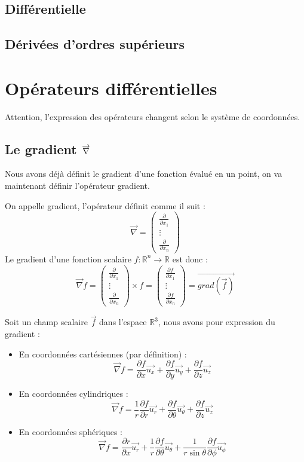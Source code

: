 \section{Différentielle}
\section{Dérivées d'ordres supérieurs}
\chapter{Opérateurs différentielles}
Attention, l'expression des opérateurs changent selon le système de coordonnées.
\section{Le gradient $\protect\overrightarrow{\nabla}$}
Nous avons déjà définit le gradient d'une fonction évalué en un point, on va maintenant définir l'opérateur gradient.
\begin{defi}
On appelle gradient, l'opérateur définit comme il suit :
$$\overrightarrow{\nabla}=\begin{pmatrix}\frac{\partial}{\partial x_1}\\\vdots\\\frac{\partial}{\partial x_n}\end{pmatrix}$$
\newline
Le gradient d'une fonction scalaire $f:\mathbb{R}^n\to\mathbb{R}$ est donc :
$$\overrightarrow{\nabla}f=\begin{pmatrix}\frac{\partial}{\partial x_1}\\\vdots\\\frac{\partial}{\partial x_n}\end{pmatrix}\times f=\begin{pmatrix}\frac{\partial f}{\partial x_1}\\\vdots\\\frac{\partial f}{\partial x_n}\end{pmatrix}=\overrightarrow{grad(\overrightarrow{f})}$$
\end{defi}
\begin{prop}
Soit un champ scalaire $\overrightarrow{f}$ dans l'espace $\mathbb{R}^3$, nous avons pour expression du gradient :
\begin{itemize}
    \item En coordonnées cartésiennes (par définition) : $$\overrightarrow{\nabla}f=\frac{\partial f}{\partial x}\overrightarrow{u_x}+\frac{\partial f}{\partial y}\overrightarrow{u_y}+\frac{\partial f}{\partial z}\overrightarrow{u_z}$$
    \item En coordonnées cylindriques : $$\overrightarrow{\nabla}f=\frac{1}{r}\frac{\partial f}{\partial r}\overrightarrow{u_r}+\frac{\partial f}{\partial \theta}\overrightarrow{u_\theta}+\frac{\partial f}{\partial z}\overrightarrow{u_z}$$
    \item En coordonnées sphériques : $$\overrightarrow{\nabla}f=\frac{\partial r}{\partial x}\overrightarrow{u_r}+\frac{1}{r}\frac{\partial f}{\partial \theta}\overrightarrow{u_\theta}+\frac{1}{r\sin{\theta}}\frac{\partial f}{\partial \phi}\overrightarrow{u_\phi}$$
\end{itemize}
\end{prop}
